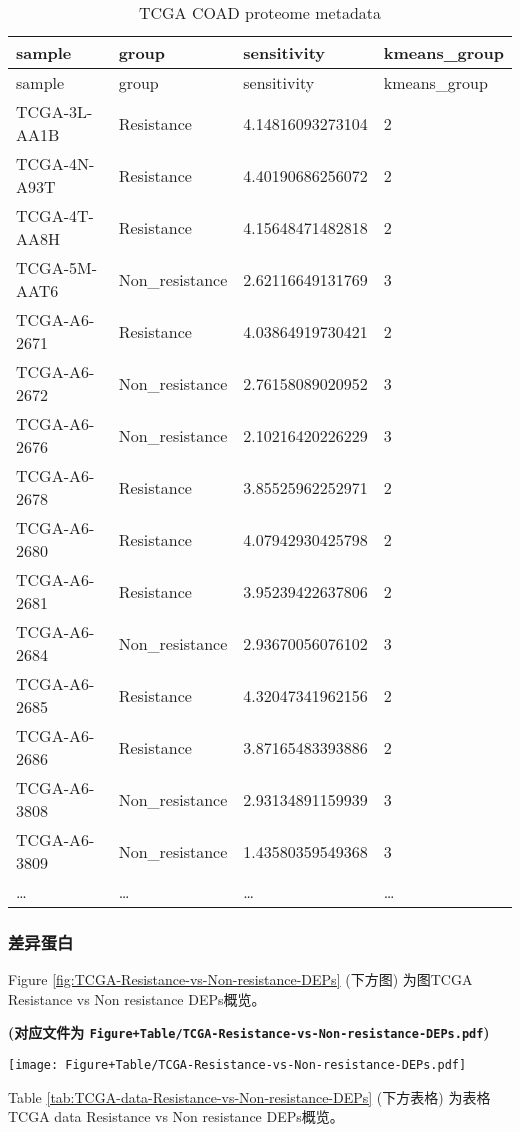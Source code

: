 \documentclass[
]{article}
\begin{document}
\begin{longtable}[]{@{}llll@{}}
\caption{\label{tab:TCGA-COAD-proteome-metadata}TCGA COAD proteome metadata}\tabularnewline
\toprule
sample & group & sensitivity & kmeans\_group\tabularnewline
\midrule
\endfirsthead
\toprule
sample & group & sensitivity & kmeans\_group\tabularnewline
\midrule
\endhead
TCGA-3L-AA1B & Resistance & 4.14816093273104 & 2\tabularnewline
TCGA-4N-A93T & Resistance & 4.40190686256072 & 2\tabularnewline
TCGA-4T-AA8H & Resistance & 4.15648471482818 & 2\tabularnewline
TCGA-5M-AAT6 & Non\_resistance & 2.62116649131769 & 3\tabularnewline
TCGA-A6-2671 & Resistance & 4.03864919730421 & 2\tabularnewline
TCGA-A6-2672 & Non\_resistance & 2.76158089020952 & 3\tabularnewline
TCGA-A6-2676 & Non\_resistance & 2.10216420226229 & 3\tabularnewline
TCGA-A6-2678 & Resistance & 3.85525962252971 & 2\tabularnewline
TCGA-A6-2680 & Resistance & 4.07942930425798 & 2\tabularnewline
TCGA-A6-2681 & Resistance & 3.95239422637806 & 2\tabularnewline
TCGA-A6-2684 & Non\_resistance & 2.93670056076102 & 3\tabularnewline
TCGA-A6-2685 & Resistance & 4.32047341962156 & 2\tabularnewline
TCGA-A6-2686 & Resistance & 3.87165483393886 & 2\tabularnewline
TCGA-A6-3808 & Non\_resistance & 2.93134891159939 & 3\tabularnewline
TCGA-A6-3809 & Non\_resistance & 1.43580359549368 & 3\tabularnewline
\ldots{} & \ldots{} & \ldots{} & \ldots{}\tabularnewline
\bottomrule
\end{longtable}

\hypertarget{ux5deeux5f02ux86cbux767d-1}{%
\subsubsection{差异蛋白}\label{ux5deeux5f02ux86cbux767d-1}}

Figure \ref{fig:TCGA-Resistance-vs-Non-resistance-DEPs} (下方图) 为图TCGA Resistance vs Non resistance DEPs概览。

\textbf{(对应文件为 \texttt{Figure+Table/TCGA-Resistance-vs-Non-resistance-DEPs.pdf})}

\def\@captype{figure}
\begin{center}
\texttt{[image: Figure+Table/TCGA-Resistance-vs-Non-resistance-DEPs.pdf]}
\caption{TCGA Resistance vs Non resistance DEPs}\label{fig:TCGA-Resistance-vs-Non-resistance-DEPs}
\end{center}

Table \ref{tab:TCGA-data-Resistance-vs-Non-resistance-DEPs} (下方表格) 为表格TCGA data Resistance vs Non resistance DEPs概览。
\end{document}
